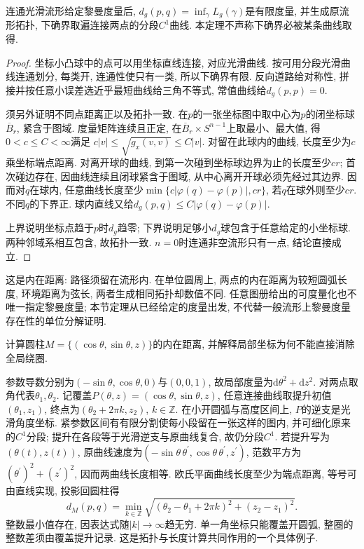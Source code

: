 \begin{theorem}\label{thm:riemannian-distance}
连通光滑流形给定黎曼度量后, $d_g(p,q)=\inf_\gamma L_g(\gamma)$是有限度量, 并生成原流形拓扑, 下确界取遍连接两点的分段$C^1$曲线. 本定理不声称下确界必被某条曲线取得.
\end{theorem}
\begin{proof}
坐标小凸球中的点可以用坐标直线连接, 对应光滑曲线. 按可用分段光滑曲线连通划分, 每类开, 连通性使只有一类, 所以下确界有限. 反向道路给对称性, 拼接并按任意小误差选近乎最短曲线给三角不等式, 常值曲线给$d_g(p,p)=0$.

须另外证明不同点距离正以及拓扑一致. 在$p$的一张坐标图中取中心为$p$的闭坐标球$\overline B_r$, 紧含于图域. 度量矩阵连续且正定, 在$\overline B_r\times S^{n-1}$上取最小、最大值, 得$0<c\le C<\infty$满足
$c|v|\le\sqrt{g_x(v,v)}\le C|v|$.
对留在此球内的曲线, 长度至少为$c$乘坐标端点距离. 对离开球的曲线, 到第一次碰到坐标球边界为止的长度至少$cr$; 首次碰边存在, 因曲线连续且闭球紧含于图域, 从中心离开开球必须先经过其边界. 因而对$q$在球内, 任意曲线长度至少$\min\{c|\varphi(q)-\varphi(p)|,cr\}$, 若$q$在球外则至少$cr$. 不同$q$的下界正. 球内直线又给$d_g(p,q)\le C|\varphi(q)-\varphi(p)|$.

上界说明坐标点趋于$p$时$d_g$趋零; 下界说明足够小$d_g$球包含于任意给定的小坐标球. 两种邻域系相互包含, 故拓扑一致. $n=0$时连通非空流形只有一点, 结论直接成立.
\end{proof}
这是内在距离: 路径须留在流形内. 在单位圆周上, 两点的内在距离为较短圆弧长度, 环境距离为弦长, 两者生成相同拓扑却数值不同. 任意图册给出的可度量化也不唯一指定黎曼度量; 本节定理从已经给定的度量出发, 不代替一般流形上黎曼度量存在性的单位分解证明.

\begin{example}
计算圆柱$M=\{(\cos\theta,\sin\theta,z)\}$的内在距离, 并解释局部坐标为何不能直接消除全局绕圈.
\end{example}
\begin{solution}
参数导数分别为$(-\sin\theta,\cos\theta,0)$与$(0,0,1)$, 故局部度量为$\mathrm d\theta^2+\mathrm dz^2$. 对两点取角代表$\theta_1,\theta_2$. 记覆盖$P(\theta,z)=(\cos\theta,\sin\theta,z)$, 任意连接曲线取提升初值$(\theta_1,z_1)$, 终点为$(\theta_2+2\pi k,z_2)$, $k\in\mathbb Z$. 在小开圆弧与高度区间上, $P$的逆支是光滑角度坐标. 紧参数区间有有限分割使每小段留在一张这样的图内, 并可细化原来的$C^1$分段; 提升在各段等于光滑逆支与原曲线复合, 故仍分段$C^1$. 若提升写为$(\theta(t),z(t))$, 原曲线速度为$(-\sin\theta\,\theta^{\prime},\cos\theta\,\theta^{\prime},z^{\prime})$, 范数平方为$(\theta^{\prime})^2+(z^{\prime})^2$, 因而两曲线长度相等. 欧氏平面曲线长度至少为端点距离, 等号可由直线实现, 投影回圆柱得
\[
 d_M(p,q)=\min_{k\in\mathbb Z}
 \sqrt{(\theta_2-\theta_1+2\pi k)^2+(z_2-z_1)^2}.
\]
整数最小值存在, 因表达式随$|k|\to\infty$趋无穷. 单一角坐标只能覆盖开圆弧, 整圈的整数差须由覆盖提升记录. 这是拓扑与长度计算共同作用的一个具体例子.
\end{solution}

